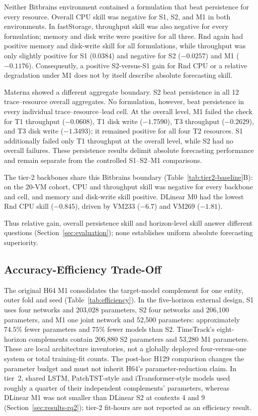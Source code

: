 \documentclass[a4paper,fleqn]{cas-dc}
\begin{document}
Neither Bitbrains environment contained a formulation that beat persistence
for every resource. Overall CPU skill was negative for S1, S2, and M1 in both
environments. In fastStorage, throughput skill was also negative for every
formulation; memory and disk write were positive for all three. Rnd again had
positive memory and disk-write skill for all formulations, while throughput
was only slightly positive for S1 ($0.0384$) and negative for S2 ($-0.0257$)
and M1 ($-0.1176$). Consequently, a positive S2-versus-S1 gain for Rnd CPU or a
relative degradation under M1 does not by itself describe absolute forecasting
skill.

Materna showed a different aggregate boundary. S2 beat persistence in all 12
trace--resource overall aggregates. No formulation, however, beat persistence
in every individual trace--resource--lead cell. At the overall level, M1 failed
the check for T1 throughput ($-0.0608$), T1 disk write ($-1.7590$), T3
throughput ($-0.2629$), and T3 disk write ($-1.3493$); it remained positive for
all four T2 resources. S1 additionally failed only T1 throughput at the overall
level, while S2 had no overall failures. These persistence results delimit
absolute forecasting performance and remain separate from the controlled
S1--S2--M1 comparisons.

The tier-2 backbones share this Bitbrains boundary
(Table~\ref{tab:tier2-baseline}B): on the 20-VM cohort, CPU and throughput
skill was negative for every backbone and cell, and memory and disk-write
skill positive. DLinear M0 had the lowest Rnd CPU skill ($-0.845$), driven
by VM233 ($-6.7$) and VM269 ($-1.81$).

Thus relative gain, overall persistence skill and horizon-level skill answer
different questions (Section~\ref{sec:evaluation}); none establishes uniform
absolute forecasting superiority.

\subsection{Accuracy-Efficiency Trade-Off}
\label{sec:results-efficiency}

The original H64 M1 consolidates the target-model complement for one entity,
outer fold and seed (Table~\ref{tab:efficiency}). In the five-horizon external design, S1 uses four
networks and 203,028 parameters, S2 four networks and 206,100 parameters, and
M1 one joint network and 52,500 parameters: approximately $74.5\%$ fewer
parameters and $75\%$ fewer models than S2. TimeTrack's eight-horizon
complements contain 206,880 S2 parameters and 53,280 M1 parameters. These
are local architecture inventories, not a globally deployed four-versus-one
system or total training-fit counts. The post-hoc H129 comparison changes
the parameter budget and must not inherit H64's parameter-reduction claim.
In tier~2, shared LSTM, PatchTST-style and iTransformer-style models used
roughly a quarter of their independent complements' parameters, whereas
DLinear M1 was not smaller than DLinear S2 at contexts 4 and 9
(Section~\ref{sec:results-rq2}); tier-2 fit-hours are not reported as an
efficiency result.
\end{document}
